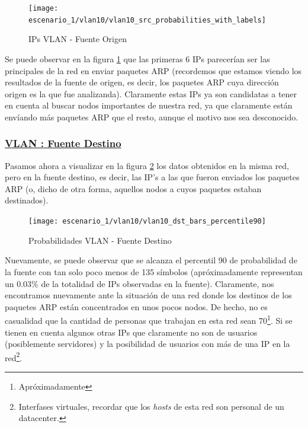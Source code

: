     \begin{figure}[!ht]
        \centering
        \texttt{[image: escenario\_1/vlan10/vlan10\_src\_probabilities\_with\_labels]}
        \caption{IPs VLAN  - Fuente Origen}
        \label{fig:vlan10_src_prob_ips}
    \end{figure}

    \par Se puede observar en la figura \ref{fig:vlan10_src_prob_ips} que las primeras 6 IPs parecer\'ian
    ser las principales de la red en enviar paquetes ARP (recordemos que estamos viendo los resultados
    de la fuente de origen, es decir, los paquetes ARP cuya direcci\'on origen es la que fue
    analizanda). Claramente estas IPs ya son candidatas a tener en cuenta al buscar nodos importantes
    de nuestra red, ya que claramente est\'an env\'iando m\'as paquetes ARP que el resto, aunque el
    motivo nos sea desconocido.


    \subsubsection*{\underline{VLAN : Fuente Destino}}\label{subsubsec:vlan10_dst}
    \par Pasamos ahora a visualizar en la figura \ref{fig:vlan10_dst_prob_per90} los datos obtenidos
    en la misma red, pero en la fuente destino, es decir, las IP's a las que fueron enviados los
    paquetes ARP (o, dicho de otra forma, aquellos nodos a cuyos paquetes estaban destinados).

    \begin{figure}[!ht]
        \centering
        \texttt{[image: escenario\_1/vlan10/vlan10\_dst\_bars\_percentile90]}
        \caption{Probabilidades VLAN  - Fuente Destino}
        \label{fig:vlan10_dst_prob_per90}
    \end{figure}

    \par Nuevamente, se puede observar que se alcanza el percentil 90 de probabilidad de la
    fuente con tan solo poco menos de 135 s\'imbolos (apr\'oximadamente representan un
    0.03\% de la totalidad de IPs observadas en la fuente). Claramente, nos encontramos
    nuevamente ante la situaci\'on de una red donde los destinos de los paquetes ARP
    est\'an concentrados en unos pocos nodos. De hecho, no es casualidad que la cantidad
    de personas que trabajan en esta red sean 70\footnote{Apr\'oximadamente}. Si se tienen
    en cuenta algunos otras IPs que claramente no son de usuarios (posiblemente servidores)
    y la posibilidad de usuarios con m\'as de una IP en la red\footnote{Interfases virtuales,
    recordar que los \textit{hosts} de esta red son personal de un datacenter.}.

